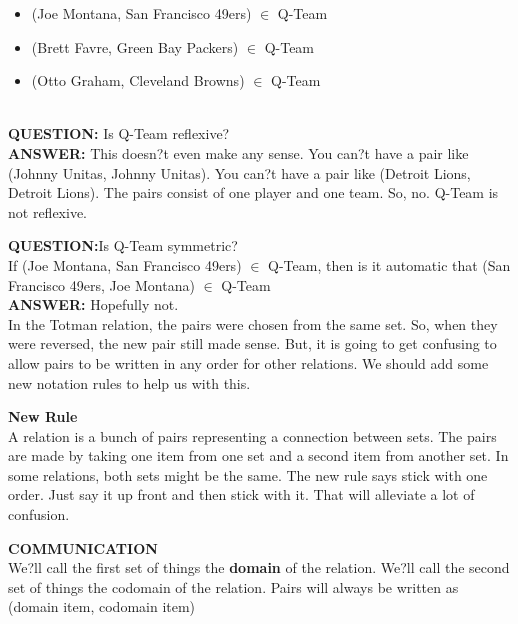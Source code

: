 \documentclass{ximera}
\begin{document}
\begin{example}
\begin{itemize}
 \item (Joe Montana, San Francisco 49ers) $\in$ Q-Team
 \item (Brett Favre, Green Bay Packers) $\in$ Q-Team
 \item (Otto Graham, Cleveland Browns) $\in$ Q-Team
\end{itemize}
\end{example}

\quad \\



\textbf{QUESTION:} Is Q-Team reflexive? \\
\textbf{ANSWER:} This doesn?t even make any sense.  You can?t have a pair like (Johnny Unitas, Johnny Unitas). You can?t have a pair like (Detroit Lions, Detroit Lions).  The pairs consist of one player and one team. So, no. Q-Team is not reflexive.


\textbf{QUESTION:}Is Q-Team symmetric?\\
If (Joe Montana, San Francisco 49ers) $\in$ Q-Team, then is it automatic that (San Francisco 49ers, Joe Montana) $\in$ Q-Team\\
\textbf{ANSWER:} Hopefully not. \\
In the Totman relation, the pairs were chosen from the same set.  So, when they were reversed, the new pair still made sense.  But, it is going to get confusing to allow pairs to be written in any order for other relations. We should add some new notation rules to help us with this.


\textbf{New Rule} \\
A relation is a bunch of pairs representing a connection between sets.  The pairs are made by taking one item from one set and a second item from another set. In some relations, both sets might be the same.  The new rule says stick with one order.  Just say it up front and then stick with it.  That will alleviate a lot of confusion.



\begin{remark} \textbf{COMMUNICATION} \\
We?ll call the first set of things the \textbf{domain} of the relation.
We?ll call the second set of things the codomain of the relation.
Pairs will always be written as
 (domain item, codomain item) 
\end{remark}
\end{document}
